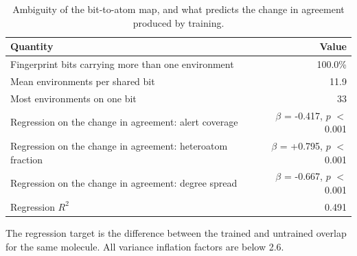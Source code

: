 \begin{table}[htbp]
\centering
\caption{Ambiguity of the bit-to-atom map, and what predicts the change in agreement produced by training.}
\label{tab:si_misc}
\small
\setlength{\tabcolsep}{4pt}
\begin{tabular}{lr}
\toprule
Quantity & Value \\
\midrule
Fingerprint bits carrying more than one environment & 100.0\% \\
Mean environments per shared bit & 11.9 \\
Most environments on one bit & 33 \\
Regression on the change in agreement: alert coverage & $\beta$ = -0.417, $p$ $<$ 0.001 \\
Regression on the change in agreement: heteroatom fraction & $\beta$ = +0.795, $p$ $<$ 0.001 \\
Regression on the change in agreement: degree spread & $\beta$ = -0.667, $p$ $<$ 0.001 \\
Regression $R^2$ & 0.491 \\
\bottomrule
\end{tabular}
\begin{flushleft}\footnotesize The regression target is the difference between the trained and untrained overlap for the same molecule. All variance inflation factors are below 2.6.\end{flushleft}
\end{table}
